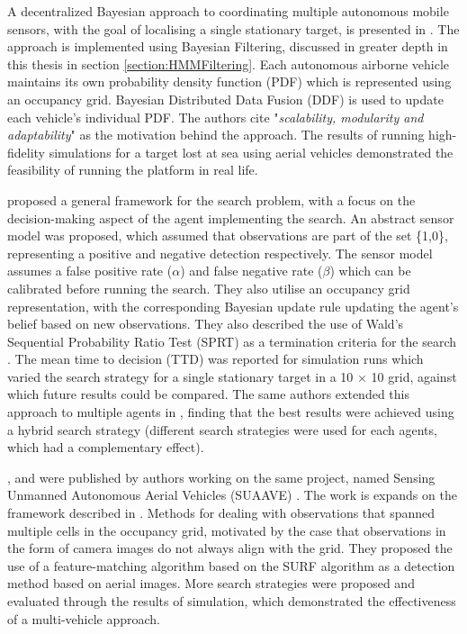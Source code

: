 A decentralized Bayesian approach to coordinating multiple autonomous mobile sensors, with the goal of localising a single stationary target, is presented in \cite{Bourgault2005DecentralizedSearch}. The approach is implemented using Bayesian Filtering, discussed in greater depth in this thesis in section \ref{section:HMMFiltering}. Each autonomous airborne vehicle maintains its own probability density function (PDF) which is represented using an occupancy grid. Bayesian Distributed Data Fusion (DDF) is used to update each vehicle's individual PDF. The authors cite "\textit{scalability, modularity and adaptability}" as the motivation behind the approach. The results of running high-fidelity simulations for a target lost at sea using aerial vehicles demonstrated the feasibility of running the platform in real life.

\cite{Chung2007ASearch} proposed a general framework for the search problem, with a focus on the decision-making aspect of the agent implementing the search. An abstract sensor model was proposed, which assumed that observations are part of the set \{1,0\}, representing a positive and negative detection respectively. The sensor model assumes a false positive rate ($\alpha$) and false negative rate ($\beta$) which can be calibrated before running the search. They also utilise an occupancy grid representation, with the corresponding Bayesian update rule updating the agent's belief based on new observations. They also described the use of Wald's Sequential Probability Ratio Test (SPRT) as a termination criteria for the search \cite{Wald1945SequentialHypotheses}. The mean time to decision (TTD) was reported for simulation runs which varied the search strategy for a single stationary target in a 10 $\times$ 10 grid, against which future results could be compared. The same authors extended this approach to multiple agents in \cite{Chung2008Multi-agentFramework}, finding that the best results were achieved using a hybrid search strategy (different search strategies were used for each agents, which had a complementary effect).

\cite{Waharte2009CoordinatedUAVs}, \cite{Waharte2010ProbabilisticUAVs} and \cite{Waharte2010SupportingUAVsb} were published by authors working on the same project, named Sensing Unmanned Autonomous Aerial Vehicles (SUAAVE) \cite{Cameron2010SUAAVE:Details}. The work is expands on the framework described in \cite{Chung2007ASearch}. Methods for dealing with observations that spanned multiple cells in the occupancy grid, motivated by the case that observations in the form of camera images do not always align with the grid. They proposed the use of a feature-matching algorithm based on the SURF \cite{Bay2006SURF:Features} algorithm as a detection method based on aerial images. More search strategies were proposed and evaluated through the results of simulation, which demonstrated the effectiveness of a multi-vehicle approach.

